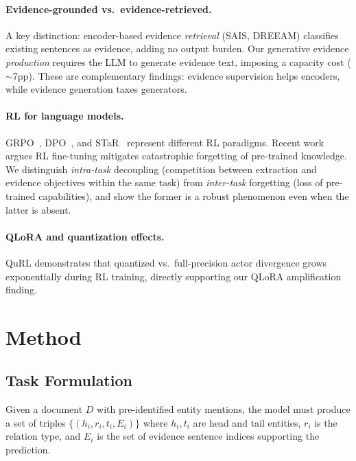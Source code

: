 \documentclass[11pt,a4paper]{article}
\begin{document}
\paragraph{Evidence-grounded vs.\ evidence-retrieved.} A key distinction: encoder-based evidence \emph{retrieval} (SAIS, DREEAM) classifies existing sentences as evidence, adding no output burden. Our generative evidence \emph{production} requires the LLM to generate evidence text, imposing a capacity cost ($\sim$7pp). These are complementary findings: evidence supervision helps encoders, while evidence generation taxes generators.

\paragraph{RL for language models.} GRPO~\cite{shao2024deepseekmath}, DPO~\cite{rafailov2023dpo}, and STaR~\cite{zelikman2022star} represent different RL paradigms. Recent work argues RL fine-tuning mitigates catastrophic forgetting of pre-trained knowledge. We distinguish \emph{intra-task} decoupling (competition between extraction and evidence objectives within the same task) from \emph{inter-task} forgetting (loss of pre-trained capabilities), and show the former is a robust phenomenon even when the latter is absent.

\paragraph{QLoRA and quantization effects.} QuRL demonstrates that quantized vs.\ full-precision actor divergence grows exponentially during RL training, directly supporting our QLoRA amplification finding.

\section{Method}
\label{sec:method}

\subsection{Task Formulation}

Given a document $D$ with pre-identified entity mentions, the model must produce a set of triples $\{(h_i, r_i, t_i, E_i)\}$ where $h_i, t_i$ are head and tail entities, $r_i$ is the relation type, and $E_i$ is the set of evidence sentence indices supporting the prediction.
\end{document}
